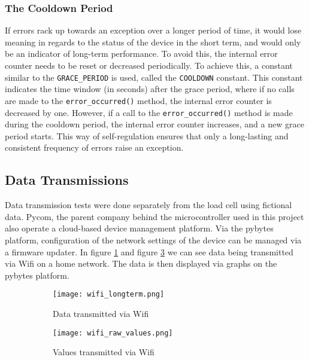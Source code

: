 \subsubsection{The Cooldown Period}
If errors rack up towards an exception over a longer period of time, it would lose meaning in regards to the status of the device in the short term, and would only be an indicator of long-term performance. To avoid this, the internal error counter needs to be reset or decreased periodically. To achieve this, a constant similar to the \lstinline{GRACE_PERIOD} is used, called the \lstinline{COOLDOWN} constant. This constant indicates the time window (in seconds) after the grace period, where if no calls are made to the \lstinline{error_occurred()} method, the internal error counter is decreased by one. However, if a call to the \lstinline{error_occurred()} method is made during the cooldown period, the internal error counter increases, and a new grace period starts. This way of self-regulation ensures that only a long-lasting and consistent frequency of errors raise an exception.


\subsection{Data Transmissions}
Data transmission tests were done separately from the load cell using fictional data. Pycom, the parent company behind the microcontroller used in this project also operate a cloud-based device management platform. \cite{pybytes-website} Via the pybytes platform, configuration of the network settings of the device can be managed via a firmware updater. 
In figure \ref{fig:wifi_longterm} and figure \ref{fig:wifi_raw_values} we can see data being transmitted via Wifi on a home network. The data is then displayed via graphs on the pybytes platform.

\begin{figure}[H]
\centering
	\begin{subfigure}[b]{0.4\textwidth}
    \texttt{[image: wifi\_longterm.png]}
    \caption{Data transmitted via Wifi}
    \label{fig:wifi_longterm}
	\end{subfigure}
	\begin{subfigure}[b]{0.4\textwidth}
    \texttt{[image: wifi\_raw\_values.png]}
    \caption{Values transmitted via Wifi}
    \label{fig:wifi_raw_values}
	\end{subfigure}
\caption{}
\end{figure}

